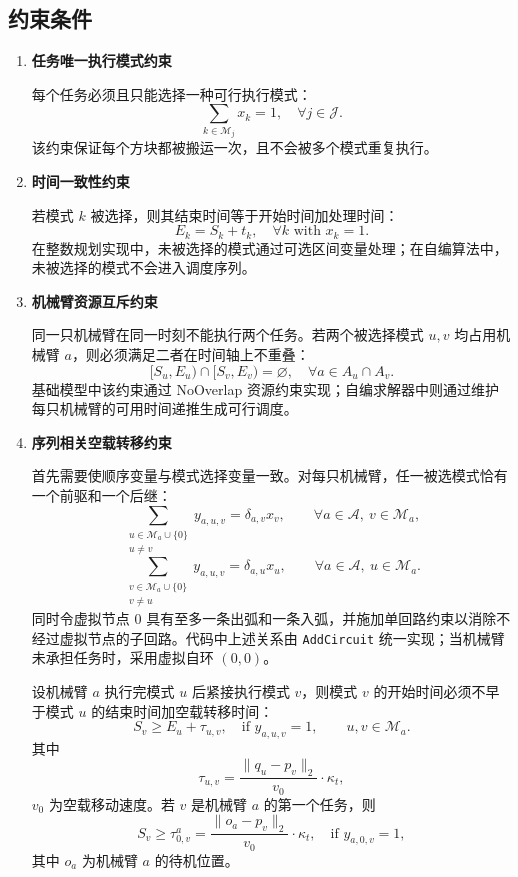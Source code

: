 \subsection{约束条件}
\begin{enumerate}
\item \textbf{任务唯一执行模式约束}

每个任务必须且只能选择一种可行执行模式：
\[
    \sum_{k\in\mathcal{M}_j}x_k=1,\quad \forall j\in\mathcal{J}.
\]
该约束保证每个方块都被搬运一次，且不会被多个模式重复执行。

\item \textbf{时间一致性约束}

若模式 $k$ 被选择，则其结束时间等于开始时间加处理时间：
\[
    E_k=S_k+t_k,\quad \forall k \text{ with } x_k=1.
\]
在整数规划实现中，未被选择的模式通过可选区间变量处理；在自编算法中，未被选择的模式不会进入调度序列。

\item \textbf{机械臂资源互斥约束}

同一只机械臂在同一时刻不能执行两个任务。若两个被选择模式 $u,v$ 均占用机械臂 $a$，则必须满足二者在时间轴上不重叠：
\[
    [S_u,E_u)\cap [S_v,E_v)=\varnothing,\quad
    \forall a\in A_u\cap A_v.
\]
基础模型中该约束通过 NoOverlap 资源约束实现；自编求解器中则通过维护每只机械臂的可用时间递推生成可行调度。

\item \textbf{序列相关空载转移约束}

首先需要使顺序变量与模式选择变量一致。对每只机械臂，任一被选模式恰有一个前驱和一个后继：
\[
    \sum_{\substack{u\in\mathcal M_a\cup\{0\}\\u\ne v}}y_{a,u,v}
    =\delta_{a,v}x_v,
    \qquad \forall a\in\mathcal A,\ v\in\mathcal M_a,
\]
\[
    \sum_{\substack{v\in\mathcal M_a\cup\{0\}\\v\ne u}}y_{a,u,v}
    =\delta_{a,u}x_u,
    \qquad \forall a\in\mathcal A,\ u\in\mathcal M_a.
\]
同时令虚拟节点 $0$ 具有至多一条出弧和一条入弧，并施加单回路约束以消除不经过虚拟节点的子回路。代码中上述关系由 \texttt{AddCircuit} 统一实现；当机械臂未承担任务时，采用虚拟自环 $(0,0)$。

设机械臂 $a$ 执行完模式 $u$ 后紧接执行模式 $v$，则模式 $v$ 的开始时间必须不早于模式 $u$ 的结束时间加空载转移时间：
\[
    S_v\ge E_u+\tau_{u,v},\quad \text{if } y_{a,u,v}=1,
    \qquad u,v\in\mathcal M_a.
\]
其中
\[
    \tau_{u,v}=\frac{\|q_u-p_v\|_2}{v_0}\cdot \kappa_t,
\]
$v_0$ 为空载移动速度。若 $v$ 是机械臂 $a$ 的第一个任务，则
\[
    S_v\ge \tau^a_{0,v}
    =\frac{\|o_a-p_v\|_2}{v_0}\cdot \kappa_t,
    \quad \text{if }y_{a,0,v}=1,
\]
其中 $o_a$ 为机械臂 $a$ 的待机位置。


\end{enumerate}
